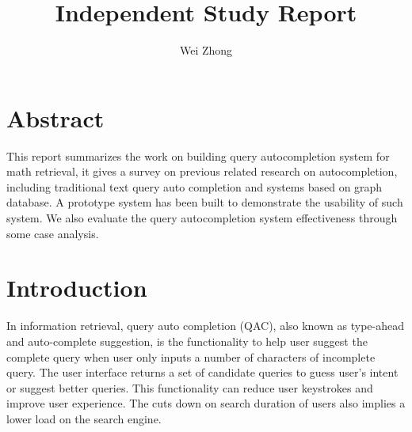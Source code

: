 \documentclass[12pt]{article} %
\begin{document}
\title{Independent Study Report}
\author{Wei Zhong}
\date{}

\maketitle

\section{Abstract}
This report summarizes the work on building query autocompletion system for math retrieval, it gives a survey on previous related research on autocompletion, including traditional text query auto completion and systems based on graph database. A prototype system has been built to demonstrate the usability of such system. We also evaluate the query autocompletion system effectiveness through some case analysis.

\section{Introduction}
In information retrieval, query auto completion (QAC), also known as type-ahead and auto-complete suggestion, is the functionality to help user suggest the complete query when user only inputs a number of characters of incomplete query.
The user interface returns a set of candidate queries 
to guess user's intent or suggest better queries.
This functionality can reduce user keystrokes and improve user experience.
The cuts down on search duration of users also implies a lower load on the search engine.
\end{document}

